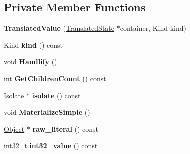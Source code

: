 \subsection*{Private Member Functions}
\begin{DoxyCompactItemize}
\item 
{\bfseries Translated\+Value} (\hyperlink{classv8_1_1internal_1_1_translated_state}{Translated\+State} $\ast$container, Kind kind)\hypertarget{classv8_1_1internal_1_1_translated_value_aa1e4b6f9f8cde0c90212a712a26ab729}{}\label{classv8_1_1internal_1_1_translated_value_aa1e4b6f9f8cde0c90212a712a26ab729}

\item 
Kind {\bfseries kind} () const \hypertarget{classv8_1_1internal_1_1_translated_value_a5022e69644940210d162174bedba240c}{}\label{classv8_1_1internal_1_1_translated_value_a5022e69644940210d162174bedba240c}

\item 
void {\bfseries Handlify} ()\hypertarget{classv8_1_1internal_1_1_translated_value_aadcdc1bb6c61c20246642de6e65810dc}{}\label{classv8_1_1internal_1_1_translated_value_aadcdc1bb6c61c20246642de6e65810dc}

\item 
int {\bfseries Get\+Children\+Count} () const \hypertarget{classv8_1_1internal_1_1_translated_value_a5c4efa06e44a6926cd5abd57c7e53c97}{}\label{classv8_1_1internal_1_1_translated_value_a5c4efa06e44a6926cd5abd57c7e53c97}

\item 
\hyperlink{classv8_1_1internal_1_1_isolate}{Isolate} $\ast$ {\bfseries isolate} () const \hypertarget{classv8_1_1internal_1_1_translated_value_aa0ebc98050c59012786abbc2db1384c0}{}\label{classv8_1_1internal_1_1_translated_value_aa0ebc98050c59012786abbc2db1384c0}

\item 
void {\bfseries Materialize\+Simple} ()\hypertarget{classv8_1_1internal_1_1_translated_value_a9920c36d6335ff51572070285ecd0c08}{}\label{classv8_1_1internal_1_1_translated_value_a9920c36d6335ff51572070285ecd0c08}

\item 
\hyperlink{classv8_1_1internal_1_1_object}{Object} $\ast$ {\bfseries raw\+\_\+literal} () const \hypertarget{classv8_1_1internal_1_1_translated_value_aca6f8b3d3efe1fe06ad34d11093e988b}{}\label{classv8_1_1internal_1_1_translated_value_aca6f8b3d3efe1fe06ad34d11093e988b}

\item 
int32\+\_\+t {\bfseries int32\+\_\+value} () const \hypertarget{classv8_1_1internal_1_1_translated_value_a2c9e4bdbd3fd08476063c56466aa65b6}{}\label{classv8_1_1internal_1_1_translated_value_a2c9e4bdbd3fd08476063c56466aa65b6}


\end{DoxyCompactItemize}
